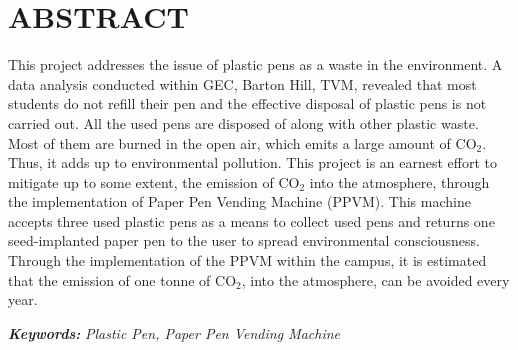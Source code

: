 
 \parbox[1in]{4in}{}

\section*{ABSTRACT} 

\parbox[1in]{2in}{ }

This project addresses the issue of plastic pens as a waste in the environment. A data analysis conducted within GEC, Barton Hill, TVM, revealed that most students do not refill their pen and the effective disposal of plastic pens is not carried out. All the used pens are disposed of along with other plastic waste. Most of them are burned in the open air, which emits a large amount of CO$_2$. Thus, it adds up to environmental pollution. This project is an earnest effort to mitigate up to some extent, the emission of CO$_2$ into the atmosphere, through the implementation of Paper Pen Vending Machine (PPVM). This machine accepts three used plastic pens as a means to collect used pens and returns one seed-implanted paper pen to the user to spread environmental consciousness. Through the implementation of the PPVM within the campus, it is estimated that the emission of one tonne of CO$_2$, into the atmosphere, can be avoided every year.
  


\vspace{5mm} 
\noindent \textbf{\textit{Keywords:} } %
\textit{Plastic Pen, Paper Pen Vending Machine}

